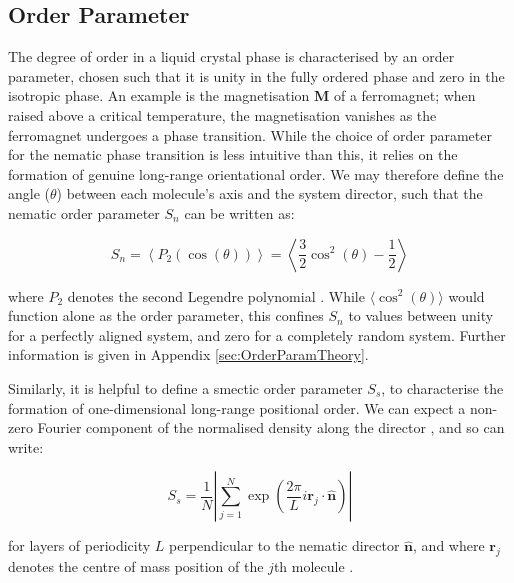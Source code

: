 \documentclass[11pt, a4paper]{article} %
\begin{document}
\subsection{Order Parameter}

The degree of order in a liquid crystal phase is characterised by an order parameter, chosen such that it is unity in the fully ordered phase and zero in the isotropic phase. An example is the magnetisation $\textbf{M}$ of a ferromagnet; when raised above a critical temperature, the magnetisation vanishes as the ferromagnet undergoes a phase transition. While the choice of order parameter for the nematic phase transition is less intuitive than this, it relies on the formation of genuine long-range orientational order. We may therefore define the angle ($\theta$) between each molecule's axis and the system director, such that the nematic order parameter $S_{n}$ can be written as:

\begin{equation}
S_{n} = \left\langle P_{2}(\cos(\theta)) \right\rangle = \left\langle \frac{3}{2}\cos^{2}(\theta) - \frac{1}{2} \right\rangle 
\end{equation}

where $P_{2}$ denotes the second Legendre polynomial \cite{DeGennes1993}. While $\langle \cos^{2}(\theta) \rangle$ would function alone as the order parameter, this confines $S_{n}$ to values between unity for a perfectly aligned system, and zero for a completely random system. Further information is given in Appendix \ref{sec:OrderParamTheory}.


Similarly, it is helpful to define a smectic order parameter $S_{s}$, to characterise the formation of one-dimensional long-range positional order. We can expect a non-zero Fourier component of the normalised density along the director \cite{Polson1997}, and so can write:

\begin{equation}
S_{s} = \frac{1}{N} \left\lvert \sum_{j=1}^{N} \exp \left( {\frac{2\pi}{L}i\textbf{r}_{j} \cdot \boldsymbol{\hat{n}}} \right) \right\rvert
\end{equation}

for layers of periodicity $L$ perpendicular to the nematic director $\boldsymbol{\hat{n}}$, and where $\textbf{r}_{j}$ denotes the centre of mass position of the $j$th molecule \cite{Dussi2018}.
\end{document}
